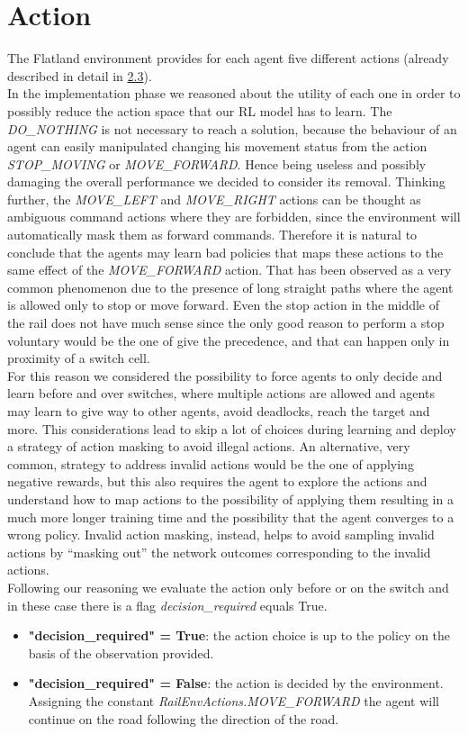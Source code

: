 \section{Action}
The Flatland environment provides for each agent five different actions (already described in detail in \hyperref[sec:envActions]{2.3}).\\
In the implementation phase we reasoned about the utility of each one in order to possibly reduce the action space that our RL model has to learn.
The \textit{DO\_NOTHING} is not necessary to reach a solution, because the behaviour of an agent can easily manipulated changing his movement status from the action \textit{STOP\_MOVING} or \textit{MOVE\_FORWARD}. Hence being useless and possibly damaging the overall performance we decided to consider its removal. Thinking further, the \textit{MOVE\_LEFT} and \textit{MOVE\_RIGHT} actions can be thought as ambiguous command actions where they are forbidden, since the environment will automatically mask them as forward commands. Therefore it is natural to conclude that the agents may learn bad policies that maps these actions to the same effect of the \textit{MOVE\_FORWARD} action. That has been observed as a very common phenomenon due to the presence of long straight paths where the agent is allowed only to stop or move forward. Even the stop action in the middle of the rail does not have much sense since the only good reason to perform a stop voluntary would be the one of give the precedence, and that can happen only in proximity of a switch cell. \\
For this reason we considered the possibility to force agents to only decide and learn before and over switches, where multiple actions are allowed and agents may learn to give way to other agents, avoid deadlocks, reach the target and more. This considerations lead to skip a lot of choices during learning and deploy a strategy of action masking to avoid illegal actions.
An alternative, very common, strategy to address invalid actions would be the one of applying negative rewards, but this also requires the agent to explore the actions and understand how to map actions to the possibility of applying them resulting in a much more longer training time and the possibility that the agent converges to a wrong policy. Invalid action masking, instead, helps to avoid sampling invalid actions by “masking out” the network outcomes corresponding to the invalid actions. \\
Following our reasoning we evaluate the action only before or on the switch and in these case there is a flag \textit{decision\_required} equals True.
\begin{itemize}
\item \textbf{"decision\_required" = True}: the action choice is up to the policy on the basis of the observation provided.
\item \textbf{"decision\_required" = False}: the action is decided by the environment. Assigning the constant \textit{RailEnvActions.MOVE\_FORWARD} the agent will continue on the road following the direction of the road.
\end{itemize}
